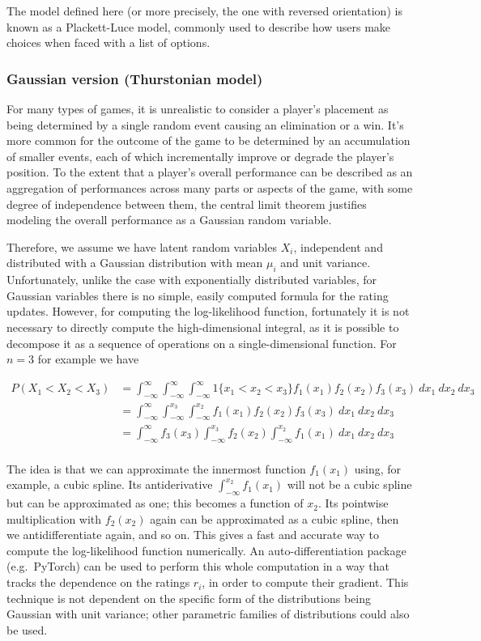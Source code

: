\documentclass{article}
\begin{document}
	The model defined here (or more precisely, the one with reversed orientation) is known as a Plackett-Luce model, commonly used to describe how users make choices when faced with a list of options.
	
	\subsubsection{Gaussian version (Thurstonian model)}
	For many types of games, it is unrealistic to consider a player's placement as being determined by a single random event causing an elimination or a win. It's more common for the outcome of the game to be determined by an accumulation of smaller events, each of which incrementally improve or degrade the player's position. To the extent that a player's overall performance can be described as an aggregation of performances across many parts or aspects of the game, with some degree of independence between them, the central limit theorem justifies modeling the overall performance as a Gaussian random variable.
	
	Therefore, we assume we have latent random variables $X_i$, independent and distributed with a Gaussian distribution with mean $\mu_i$ and unit variance. Unfortunately, unlike the case with exponentially distributed variables, for Gaussian variables there is no simple, easily computed formula for the rating updates. However, for computing the log-likelihood function, fortunately it is not necessary to directly compute the high-dimensional integral, as it is possible to decompose
	it as a sequence of operations on a single-dimensional function. For $n=3$ for example we have
	
	\begin{align*}
	P(X_1 < X_2 < X_3) &= \int_{-\infty}^{\infty} \int_{-\infty}^{\infty} \int_{-\infty}^{\infty} 1\{x_1 < x_2 < x_3\} f_1(x_1) f_2(x_2) f_3(x_3)\ dx_1\ dx_2\ dx_3 \\
	&= \int_{-\infty}^{\infty} \int_{-\infty}^{x_3} \int_{-\infty}^{x_2} f_1(x_1) f_2(x_2) f_3(x_3)\ dx_1\ dx_2\ dx_3 \\
	&= \int_{-\infty}^{\infty} f_3(x_3) \int_{-\infty}^{x_3} f_2(x_2) \int_{-\infty}^{x_2} f_1(x_1) \ dx_1\ dx_2\ dx_3 \\
	\end{align*}
	
	The idea is that we can approximate the innermost function $f_1(x_1)$ using, for example, a cubic spline. Its antiderivative $\int_{-\infty}^{x_2} f_1(x_1)$ will 
	not be a cubic spline but can be approximated as one; this becomes a function of $x_2$. Its pointwise multiplication with $f_2(x_2)$ again can be approximated as a cubic spline, then we antidifferentiate again, and so on. This gives a fast and accurate way to compute the log-likelihood function numerically. An auto-differentiation package (e.g.\ PyTorch) can be used to perform this whole computation in a way that tracks the dependence on the ratings $r_i$, in order to
	compute their gradient. This technique is not dependent on the specific form of the distributions being Gaussian with unit variance; other parametric families of distributions could also be used.
	
\end{document}
